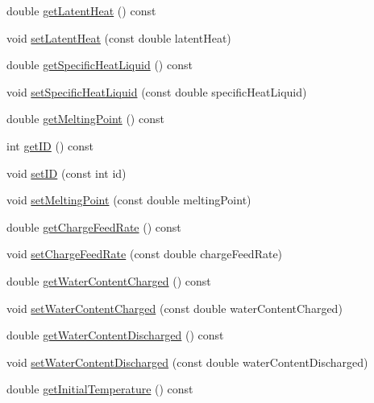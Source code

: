 \begin{DoxyCompactItemize}
double \hyperlink{class_solid_load_charge_material_add60191bd282a9cefa4bf7a60301711b}{get\+Latent\+Heat} () const
\item 
void \hyperlink{class_solid_load_charge_material_ac7361119ab7cc352dfbdc6fcb9175981}{set\+Latent\+Heat} (const double latent\+Heat)
\item 
double \hyperlink{class_solid_load_charge_material_a8b02308194b603276df3a894c401e923}{get\+Specific\+Heat\+Liquid} () const
\item 
void \hyperlink{class_solid_load_charge_material_a91fad347bf52a4f6695c304904091797}{set\+Specific\+Heat\+Liquid} (const double specific\+Heat\+Liquid)
\item 
double \hyperlink{class_solid_load_charge_material_a4be001f6e6ecbd2ad0ae1d154559cdb0}{get\+Melting\+Point} () const
\item 
int \hyperlink{class_solid_load_charge_material_a99a4a5d50309c37bf95cb2b446bcba04}{get\+ID} () const
\item 
void \hyperlink{class_solid_load_charge_material_a4cc8e12ffb340c94106cecf576a85ae5}{set\+ID} (const int id)
\item 
void \hyperlink{class_solid_load_charge_material_a6c235b1c49be98b02829d37af9c38cb2}{set\+Melting\+Point} (const double melting\+Point)
\item 
double \hyperlink{class_solid_load_charge_material_af6f018c5d67e94d86f2f57fecaa32b5c}{get\+Charge\+Feed\+Rate} () const
\item 
void \hyperlink{class_solid_load_charge_material_adc50117256b714789f68097437ca658d}{set\+Charge\+Feed\+Rate} (const double charge\+Feed\+Rate)
\item 
double \hyperlink{class_solid_load_charge_material_a2f99a8553d12b45bad53acc14338199a}{get\+Water\+Content\+Charged} () const
\item 
void \hyperlink{class_solid_load_charge_material_abf43422318a1b9120dff1dcfb15d5265}{set\+Water\+Content\+Charged} (const double water\+Content\+Charged)
\item 
double \hyperlink{class_solid_load_charge_material_aeeb6b341a6b5770155b85264dabbd1a7}{get\+Water\+Content\+Discharged} () const
\item 
void \hyperlink{class_solid_load_charge_material_a5104ddb43af977a751b90a0bc844d83d}{set\+Water\+Content\+Discharged} (const double water\+Content\+Discharged)
\item 
double \hyperlink{class_solid_load_charge_material_ae5d7f198fb1d4a3adb0cfc911a13ea06}{get\+Initial\+Temperature} () const
\item 

\end{DoxyCompactItemize}
